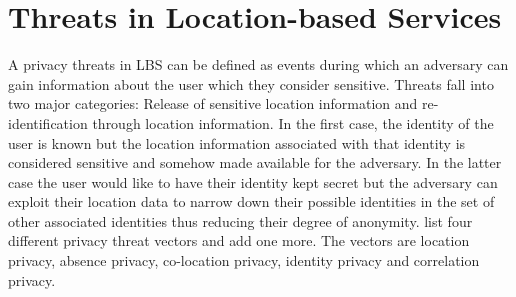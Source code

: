 \documentclass[english]{tktltiki2}
\theoremstyle{definition}
\theoremstyle{remark}
\begin{document}
\section{Threats in Location-based Services}

A privacy threats in LBS can be defined as events during which an adversary can gain information about the user which they consider sensitive\cite{LocationPrivacy}. Threats fall into two major categories: Release of sensitive location information and re-identification through location information. In the first case, the identity of the user is known but the location information associated with that identity is considered sensitive and somehow made available for the adversary. In the latter case the user would like to have their identity kept secret but the adversary can exploit their location data to narrow down their possible identities in the set of other associated identities thus reducing their degree of anonymity. \cite{LocationPrivacy} list four different privacy threat vectors and \cite{Ghinita2008} add one more. The vectors are location privacy, absence privacy, co-location privacy, identity privacy and correlation privacy.
\end{document}
